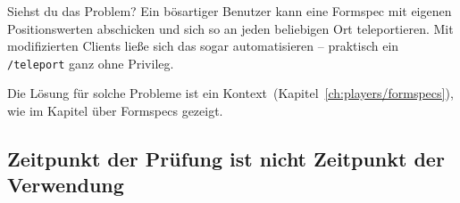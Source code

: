 \begin{Shaded}
\begin{Highlighting}[]
\OperatorTok{(}
    \OperatorTok{(}\OperatorTok{,} \OperatorTok{,} \OperatorTok{)}
         \OperatorTok{,}   \OperatorTok{(}\OperatorTok{)} 
             \OperatorTok{,} \OperatorTok{,}  \OperatorTok{=} \OperatorTok{(}
                \OperatorTok{,}
            \OperatorTok{)}
                  
                \OperatorTok{:}\OperatorTok{(\{}
                     \OperatorTok{=} \OperatorTok{(}\OperatorTok{),}
                     \OperatorTok{=} \OperatorTok{(}\OperatorTok{),}
                     \OperatorTok{=} \OperatorTok{(}\OperatorTok{),}
                \OperatorTok{\})}
                 
\OperatorTok{)}
\end{Highlighting}
\end{Shaded}

Siehst du das Problem? Ein bösartiger Benutzer kann eine Formspec mit
eigenen Positionswerten abschicken und sich so an jeden beliebigen Ort
teleportieren. Mit modifizierten Clients ließe sich das sogar
automatisieren -- praktisch ein \texttt{/\allowbreak{}teleport} ganz
ohne Privileg.

Die Lösung für solche Probleme ist ein
Kontext~(Kapitel~\ref{ch:players/formspecs}), wie im Kapitel über
Formspecs gezeigt.

\subsection{Zeitpunkt der Prüfung ist nicht Zeitpunkt der
Verwendung}\label{zeitpunkt-der-pruxfcfung-ist-nicht-zeitpunkt-der-verwendung}

